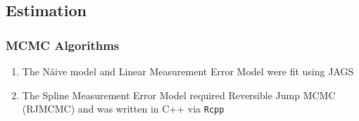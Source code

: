 \documentclass[handout]{beamer}\usepackage[]{graphicx}\usepackage[]{color}
\begin{document}
\subsection{Estimation}


\begin{frame}
\frametitle{MCMC Algorithms}

\begin{enumerate}
\item
The N{\"a}ive model and Linear Measurement Error Model were fit using JAGS
\item
The Spline Measurement Error Model required Reversible Jump MCMC (RJMCMC) and was written in C++ via \texttt{Rcpp}
\end{enumerate}


\end{frame}
\end{document}
